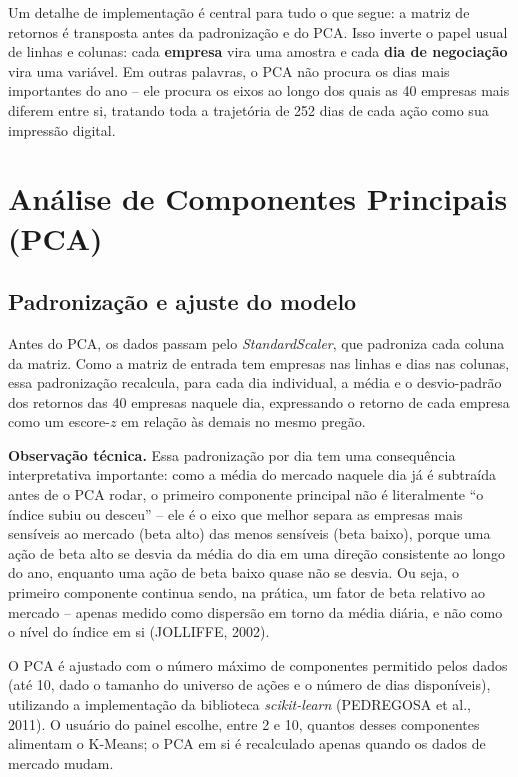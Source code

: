\documentclass[12pt,oneside,a4paper,brazil,sumario=tradicional]{abntex2}
\begin{document}
Um detalhe de implementação é central para tudo o que segue: a matriz de
retornos é transposta antes da padronização e do PCA. Isso inverte o papel usual
de linhas e colunas: cada \textbf{empresa} vira uma amostra e cada \textbf{dia de
negociação} vira uma variável. Em outras palavras, o PCA não procura os dias mais
importantes do ano -- ele procura os eixos ao longo dos quais as 40 empresas mais
diferem entre si, tratando toda a trajetória de 252 dias de cada ação como sua
impressão digital.

\section{Análise de Componentes Principais (PCA)}

\subsection{Padronização e ajuste do modelo}

Antes do PCA, os dados passam pelo \emph{StandardScaler}, que padroniza cada
coluna da matriz. Como a matriz de entrada tem empresas nas linhas e dias nas
colunas, essa padronização recalcula, para cada dia individual, a média e o
desvio-padrão dos retornos das 40 empresas naquele dia, expressando o retorno de
cada empresa como um escore-$z$ em relação às demais no mesmo pregão.

\textbf{Observação técnica.} Essa padronização por dia tem uma consequência
interpretativa importante: como a média do mercado naquele dia já é subtraída
antes de o PCA rodar, o primeiro componente principal não é literalmente ``o
índice subiu ou desceu'' -- ele é o eixo que melhor separa as empresas mais
sensíveis ao mercado (beta alto) das menos sensíveis (beta baixo), porque uma
ação de beta alto se desvia da média do dia em uma direção consistente ao longo
do ano, enquanto uma ação de beta baixo quase não se desvia. Ou seja, o primeiro
componente continua sendo, na prática, um fator de beta relativo ao mercado --
apenas medido como dispersão em torno da média diária, e não como o nível do
índice em si (JOLLIFFE, 2002).

O PCA é ajustado com o número máximo de componentes permitido pelos dados (até
10, dado o tamanho do universo de ações e o número de dias disponíveis),
utilizando a implementação da biblioteca \emph{scikit-learn}
(PEDREGOSA et al., 2011). O usuário do painel escolhe, entre 2 e 10, quantos
desses componentes alimentam o K-Means; o PCA em si é recalculado apenas quando
os dados de mercado mudam.
\end{document}
